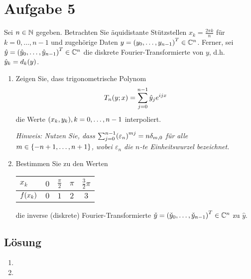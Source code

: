 \documentclass{exercise}
\begin{document}
    \section*{Aufgabe 5}
    
    \begin{problem}
        Sei \(n \in \N\) gegeben.
        Betrachten Sie äquidistante Stützstellen \(x_k = \frac{2\pi k}{n}\) für \(k = 0, \ldots, n - 1\) und zugehörige Daten \(y = \parentheses*{y_0, \ldots, y_{n - 1}}^T \in \C^n\).
        Ferner, sei \(\hat{y} = \parentheses*{\hat{y}_0, \ldots, \hat{y}_{n - 1}}^T \in \C^n\) die diskrete Fourier-Transformierte von \(y\), d.h. \(\hat{y}_k = d_k\parentheses*{y}\).
        \begin{enumerate}
            \item Zeigen Sie, dass trigonometrische Polynom
            \[
                T_n\parentheses*{y; x} = \sum_{j = 0}^{n - 1}\hat{y}_j e^{ijx}
            \]
            die Werte \(\parentheses*{x_k, y_k}, k = 0, \ldots, n - 1\) interpoliert.

            \emph{Hinweis: Nutzen Sie, dass \(\sum_{j = 0}^{n - 1}\parentheses*{\varepsilon_n}^{mj} = n \delta_{m, 0}\) für alle \(m \in \braces*{-n + 1, \ldots, n + 1}\), wobei \(\varepsilon_n\) die  \(n\)-te Einheitswurzel bezeichnet.}
            \item Bestimmen Sie zu den Werten
            \begin{center}
                \begin{tabular}{lcccc}
                    \toprule
                    \(x_k\) & \(0\) & \(\frac{\pi}{2}\) & \(\pi\) & \(\frac{3}{2}\pi\)\\
                    \midrule
                    \(f\parentheses*{x_k}\) & \(0\) & \(1\) & \(2\) & \(3\)\\
                \end{tabular}
            \end{center}
            die inverse (diskrete) Fourier-Transformierte \(\check{y} = \parentheses*{\check{y}_0, \ldots, \check{y}_{n - 1}}^T \in \C^n\) zu \(\hat{y}\).
        \end{enumerate}
    \end{problem}
    
    \subsection*{Lösung}
    \begin{enumerate}
        \item
        \item
    \end{enumerate}
\end{document}
